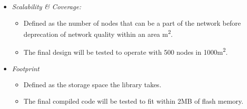 \begin{itemize}
    \item \textit{Scalability \& Coverage:}
    \begin{itemize}
        \item Defined as the number of nodes that can be a part of the network before deprecation of network quality within an area \si{m^2}. 
        \item The final design will be tested to operate with 500 nodes in 1000\si{m^2}.
    \end{itemize}
    
    \item \textit{Footprint}
    \begin{itemize}
        \item Defined as the storage space the library takes. 
        \item The final compiled code will be tested to fit within 2\si{MB} of flash memory.
    \end{itemize}
\end{itemize}